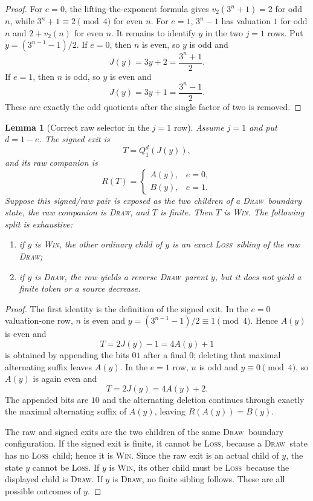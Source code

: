 \documentclass[11pt,a4paper]{article}
\newtheorem{lemma}[theorem]{Lemma}
\theoremstyle{definition}
\theoremstyle{remark}
\newcommand{\WIN}{\textnormal{\textsc{Win}}}
\newcommand{\LOSS}{\textnormal{\textsc{Loss}}}
\newcommand{\DRAW}{\textnormal{\textsc{Draw}}}
\begin{document}
\begin{proof}
For $e=0$, the lifting-the-exponent formula gives
$v_2(3^n+1)=2$ for odd $n$, while $3^n+1\equiv2\pmod4$ for even $n$.
For $e=1$, $3^n-1$ has valuation $1$ for odd $n$ and
$2+v_2(n)$ for even $n$.  It remains to identify $y$ in the two $j=1$
rows.  Put $y=(3^{n-1}-1)/2$.  If $e=0$, then $n$ is even, so $y$ is odd
and
\[
 J(y)=3y+2=\frac{3^n+1}{2}.
\]
If $e=1$, then $n$ is odd, so $y$ is even and
\[
 J(y)=3y+1=\frac{3^n-1}{2}.
\]
These are exactly the odd quotients after the single factor of two is
removed.
\end{proof}

\begin{lemma}[Correct raw selector in the $j=1$ row]\label{lem:zero-j1}
Assume $j=1$ and put $d=1-e$.  The signed exit is
\[
  T=Q_1^d(J(y)),
\]
and its raw companion is
\[
  R(T)=
  \begin{cases}
    A(y),&e=0,\\
    B(y),&e=1.
  \end{cases}
\]
Suppose this signed/raw pair is exposed as the two children of a \DRAW\
boundary state, the raw companion is \DRAW, and $T$ is finite.  Then $T$ is
\WIN.  The following split is exhaustive:
\begin{enumerate}[label=(\roman*)]
\item if $y$ is \WIN, the other ordinary child of $y$ is an exact
      \LOSS\ sibling of the raw \DRAW;
\item if $y$ is \DRAW, the row yields a reverse \DRAW\ parent $y$, but it
      does not yield a finite token or a source decrease.
\end{enumerate}
\end{lemma}

\begin{proof}
The first identity is the definition of the signed exit.  In the $e=0$
valuation-one row, $n$ is even and
$y=(3^{n-1}-1)/2\equiv1\pmod4$.  Hence $A(y)$ is even and
\[
 T=2J(y)-1=4A(y)+1
\]
is obtained by appending the bits $01$ after a final $0$; deleting that
maximal alternating suffix leaves $A(y)$.  In the $e=1$ row, $n$ is odd and
$y\equiv0\pmod4$, so $A(y)$ is again even and
\[
 T=2J(y)=4A(y)+2.
\]
The appended bits are $10$ and the alternating deletion continues through
exactly the maximal alternating suffix of $A(y)$, leaving
$R(A(y))=B(y)$.

The raw and signed exits are the two children of the same \DRAW\ boundary
configuration.  If the signed exit is finite, it cannot be \LOSS, because a
\DRAW\ state has no \LOSS\ child; hence it is \WIN.  Since the raw exit is
an actual child of $y$, the state $y$ cannot be \LOSS.  If $y$ is \WIN, its
other child must be \LOSS\ because the displayed child is \DRAW.  If $y$
is \DRAW, no finite sibling follows.  These are all possible outcomes of
$y$.
\end{proof}
\end{document}
